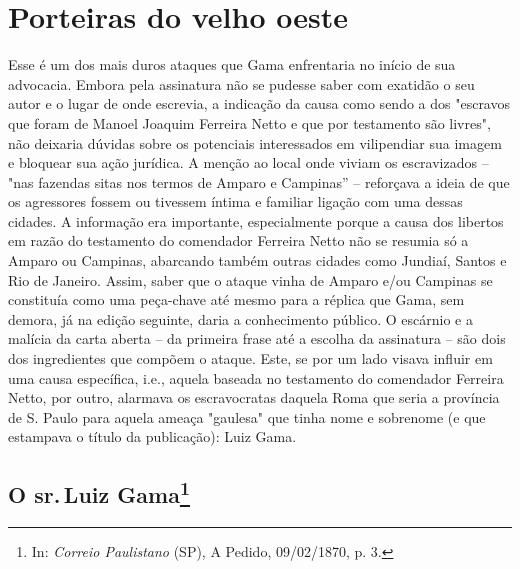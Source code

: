 \part{Porteiras do velho oeste}


\pagebreak
\mbox{}\vfill
\thispagestyle{empty}

{\small\noindent
Esse é um dos mais duros ataques que Gama enfrentaria no início de
sua advocacia. Embora pela assinatura não se pudesse saber com exatidão
o seu autor e o lugar de onde escrevia, a indicação da causa como sendo
a dos "escravos que foram de Manoel Joaquim Ferreira Netto e que por
testamento são livres", não deixaria dúvidas sobre os potenciais
interessados em vilipendiar sua imagem e bloquear sua ação jurídica. A
menção ao local onde viviam os escravizados -- "nas fazendas sitas nos
termos de Amparo e Campinas'' -- reforçava a ideia de que os agressores
fossem ou tivessem íntima e familiar ligação com uma dessas cidades. A
informação era importante, especialmente porque a causa dos libertos em
razão do testamento do comendador Ferreira Netto não se resumia só a
Amparo ou Campinas, abarcando também outras cidades como Jundiaí, Santos
e Rio de Janeiro. Assim, saber que o ataque vinha de Amparo e/ou
Campinas se constituía como uma peça-chave até mesmo para a réplica que
Gama, sem demora, já na edição seguinte, daria a conhecimento público. O
escárnio e a malícia da carta aberta -- da primeira frase até a escolha
da assinatura -- são dois dos ingredientes que compõem o ataque. Este,
se por um lado visava influir em uma causa específica, i.e., aquela
baseada no testamento do comendador Ferreira Netto, por outro, alarmava
os escravocratas daquela Roma que seria a província de S. Paulo para
aquela ameaça "gaulesa" que tinha nome e sobrenome (e que estampava o
título da publicação): Luiz Gama.}

\chapter{O sr.\,Luiz Gama\footnote[8]{In: \emph{Correio Paulistano}
  (SP), A Pedido, 09/02/1870, p. 3.}}


